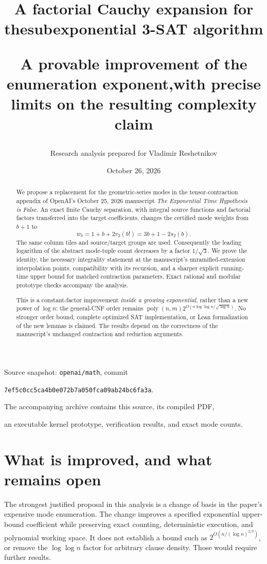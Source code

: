 \documentclass[11pt]{article}
\title{\vspace{-1em}\color{navy}\LARGE A factorial Cauchy expansion for the\newline subexponential 3-SAT algorithm\par\vspace{0.5em}\large A provable improvement of the enumeration exponent,\newline with precise limits on the resulting complexity claim}
\author{Research analysis prepared for Vladimir Reshetnikov}
\date{October 26, 2026}
\theoremstyle{remark}
\newcommand{\poly}{\operatorname{poly}}
\begin{document}
\maketitle
\thispagestyle{empty}
\begin{abstract}
We propose a replacement for the geometric-series modes in the tensor-contraction appendix of OpenAI's October 25, 2026 manuscript \emph{The Exponential Time Hypothesis is False}. An exact finite Cauchy separation, with integral source functions and factorial factors transferred into the target coefficients, changes the certified mode weights from $b+1$ to
\[
 w_b=1+b+2v_2(b!)=3b+1-2s_2(b).
\]
The same column tiles and source/target groups are used. Consequently the leading logarithm of the abstract mode-tuple count decreases by a factor $1/\sqrt3$. We prove the identity, the necessary integrality statement at the manuscript's unramified-extension interpolation points, compatibility with its recursion, and a sharper explicit running-time upper bound for matched contraction parameters. Exact rational and modular prototype checks accompany the analysis.

This is a constant-factor improvement \emph{inside a growing exponential}, rather than a new power of $\log n$: the general-CNF order remains $\poly(n,m)2^{O(n\log\log n/\sqrt{\log n})}$. No stronger order bound, complete optimized SAT implementation, or Lean formalization of the new lemmas is claimed. The results depend on the correctness of the manuscript's unchanged contraction and reduction arguments.
\end{abstract}
\vfill
\begin{center}\small
Source snapshot: \texttt{openai/math}, commit\par
\texttt{7ef5c0cc5ca4b0e072b7a050fca09ab24bc6fa3a}.\par
The accompanying archive contains this source, its compiled PDF,\par
an executable kernel prototype, verification results, and exact mode counts.
\end{center}
\clearpage
\tableofcontents
\clearpage

\section{What is improved, and what remains open}

The strongest justified proposal in this analysis is a change of basis in the paper's expensive mode enumeration. The change improves a specified exponential upper-bound coefficient while preserving exact counting, deterministic execution, and polynomial working space. It does not establish a bound such as $2^{O(n/(\log n)^{2/3})}$, or remove the $\log\log n$ factor for arbitrary clause density. Those would require further results.
\end{document}

